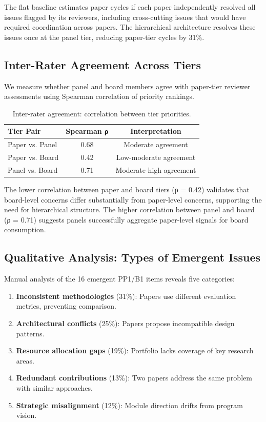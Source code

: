 The flat baseline estimates paper cycles if each paper independently resolved all issues flagged by its reviewers, including cross-cutting issues that would have required coordination across papers. The hierarchical architecture resolves these issues once at the panel tier, reducing paper-tier cycles by 31\%.

\subsection{Inter-Rater Agreement Across Tiers}

We measure whether panel and board members agree with paper-tier reviewer assessments using Spearman correlation of priority rankings.

\begin{table}[t]
\centering
\caption{Inter-rater agreement: correlation between tier priorities.}
\label{tab:agreement}
\begin{tabular}{lcc}
\toprule
Tier Pair & Spearman ρ & Interpretation \\
\midrule
Paper vs. Panel & 0.68 & Moderate agreement \\
Paper vs. Board & 0.42 & Low-moderate agreement \\
Panel vs. Board & 0.71 & Moderate-high agreement \\
\bottomrule
\end{tabular}
\end{table}

The lower correlation between paper and board tiers (ρ = 0.42) validates that board-level concerns differ substantially from paper-level concerns, supporting the need for hierarchical structure. The higher correlation between panel and board (ρ = 0.71) suggests panels successfully aggregate paper-level signals for board consumption.

\subsection{Qualitative Analysis: Types of Emergent Issues}

Manual analysis of the 16 emergent PP1/B1 items reveals five categories:

\begin{enumerate}
\item \textbf{Inconsistent methodologies} (31\%): Papers use different evaluation metrics, preventing comparison.
\item \textbf{Architectural conflicts} (25\%): Papers propose incompatible design patterns.
\item \textbf{Resource allocation gaps} (19\%): Portfolio lacks coverage of key research areas.
\item \textbf{Redundant contributions} (13\%): Two papers address the same problem with similar approaches.
\item \textbf{Strategic misalignment} (12\%): Module direction drifts from program vision.
\end{enumerate}

